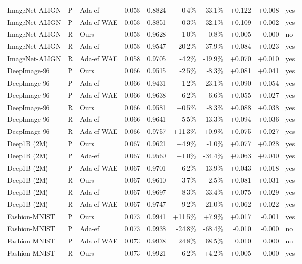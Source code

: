 \begin{tabular}{lllrrrrrrl}
ImageNet-ALIGN & P & Ada-ef & 0.058 & 0.8824 & -0.4\% & -33.1\% & +0.122 & +0.008 & yes \\
ImageNet-ALIGN & P & Ada-ef WAE & 0.058 & 0.8851 & -0.3\% & -32.1\% & +0.109 & +0.002 & yes \\
ImageNet-ALIGN & R & Ours & 0.058 & 0.9628 & -1.0\% & -0.8\% & +0.005 & -0.000 & no \\
ImageNet-ALIGN & R & Ada-ef & 0.058 & 0.9547 & -20.2\% & -37.9\% & +0.084 & +0.023 & yes \\
ImageNet-ALIGN & R & Ada-ef WAE & 0.058 & 0.9705 & -4.2\% & -19.9\% & +0.070 & +0.010 & yes \\
DeepImage-96 & P & Ours & 0.066 & 0.9515 & -2.5\% & -8.3\% & +0.081 & +0.041 & yes \\
DeepImage-96 & P & Ada-ef & 0.066 & 0.9431 & -1.2\% & -23.1\% & +0.090 & +0.054 & yes \\
DeepImage-96 & P & Ada-ef WAE & 0.066 & 0.9638 & +6.2\% & -6.6\% & +0.055 & +0.027 & yes \\
DeepImage-96 & R & Ours & 0.066 & 0.9581 & +0.5\% & -8.3\% & +0.088 & +0.038 & yes \\
DeepImage-96 & R & Ada-ef & 0.066 & 0.9641 & +5.5\% & -13.3\% & +0.094 & +0.036 & yes \\
DeepImage-96 & R & Ada-ef WAE & 0.066 & 0.9757 & +11.3\% & +0.9\% & +0.075 & +0.027 & yes \\
Deep1B (2M) & P & Ours & 0.067 & 0.9621 & +4.9\% & -1.0\% & +0.077 & +0.028 & yes \\
Deep1B (2M) & P & Ada-ef & 0.067 & 0.9560 & +1.0\% & -34.4\% & +0.063 & +0.040 & yes \\
Deep1B (2M) & P & Ada-ef WAE & 0.067 & 0.9701 & +6.2\% & -13.9\% & +0.043 & +0.018 & yes \\
Deep1B (2M) & R & Ours & 0.067 & 0.9610 & +3.7\% & -2.5\% & +0.081 & +0.031 & yes \\
Deep1B (2M) & R & Ada-ef & 0.067 & 0.9697 & +8.3\% & -33.4\% & +0.075 & +0.029 & yes \\
Deep1B (2M) & R & Ada-ef WAE & 0.067 & 0.9747 & +9.2\% & -21.0\% & +0.062 & +0.022 & yes \\
Fashion-MNIST & P & Ours & 0.073 & 0.9941 & +11.5\% & +7.9\% & +0.017 & -0.001 & yes \\
Fashion-MNIST & P & Ada-ef & 0.073 & 0.9938 & -24.8\% & -68.4\% & -0.010 & -0.000 & no \\
Fashion-MNIST & P & Ada-ef WAE & 0.073 & 0.9938 & -24.8\% & -68.5\% & -0.010 & -0.000 & no \\
Fashion-MNIST & R & Ours & 0.073 & 0.9921 & +6.2\% & +4.2\% & +0.005 & -0.000 & yes \\

\end{tabular}
